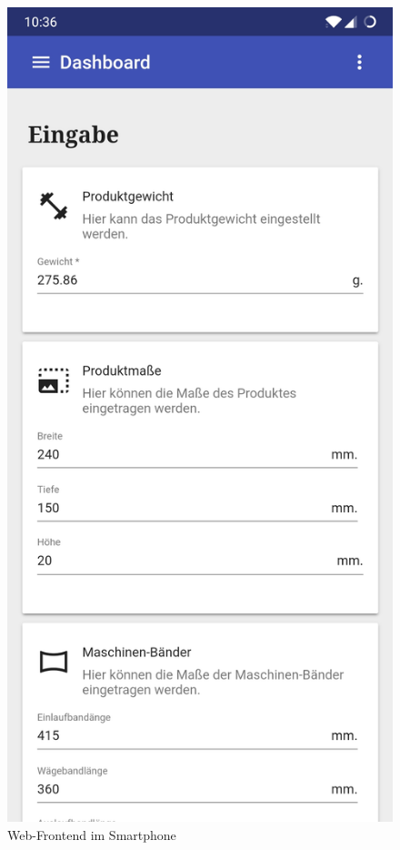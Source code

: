\begin{figure}[h]
    \centering
    \includegraphics[scale=0.15]{images/kapitel_4/website_smartphone.jpg}
    \caption{Web-Frontend im Smartphone}
    \label{fig:umsetzung_website_smartphone}
\end{figure}

